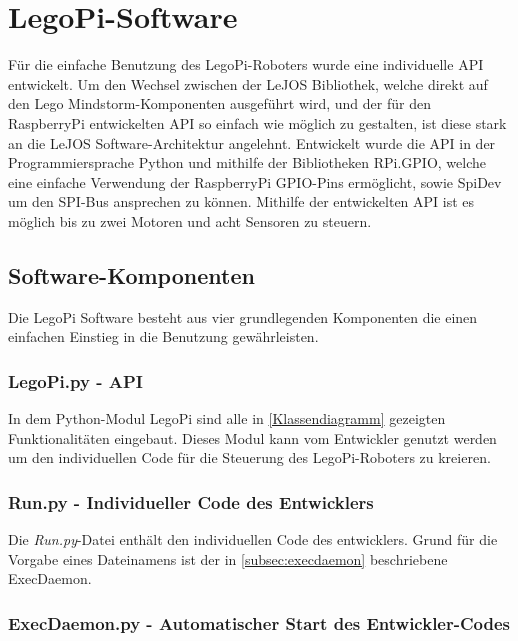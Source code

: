 \chapter{LegoPi-Software}
\label{Kap3}

Für die einfache Benutzung des LegoPi-Roboters wurde eine individuelle API entwickelt. Um den Wechsel zwischen der LeJOS Bibliothek, welche direkt auf den Lego Mindstorm-Komponenten ausgeführt wird, und der für den RaspberryPi entwickelten API so einfach wie möglich zu gestalten, ist diese stark an die LeJOS Software-Architektur angelehnt. Entwickelt wurde die API in der Programmiersprache Python und mithilfe der Bibliotheken RPi.GPIO, welche eine einfache Verwendung der RaspberryPi GPIO-Pins ermöglicht, sowie SpiDev um den SPI-Bus ansprechen zu können. Mithilfe der entwickelten API ist es möglich bis zu zwei Motoren und acht Sensoren zu steuern.

\section{Software-Komponenten}

Die LegoPi Software besteht aus vier grundlegenden Komponenten die einen einfachen Einstieg in die Benutzung gewährleisten.

\subsection{LegoPi.py - API}

In dem Python-Modul LegoPi sind alle in \autoref{Klassendiagramm} gezeigten Funktionalitäten eingebaut. Dieses Modul kann vom Entwickler genutzt werden um den individuellen Code für die Steuerung des LegoPi-Roboters zu kreieren.  

\subsection{Run.py - Individueller Code des Entwicklers}

Die \emph{Run.py}-Datei enthält den individuellen Code des entwicklers. Grund für die Vorgabe eines Dateinamens ist der in \autoref{subsec:execdaemon} beschriebene ExecDaemon.

\subsection{ExecDaemon.py - Automatischer Start des Entwickler-Codes}
\label{subsec:execdaemon}

